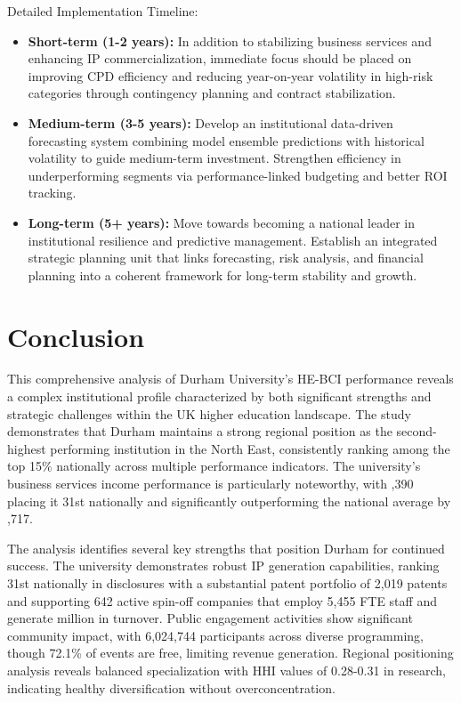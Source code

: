 \documentclass[journal,onecolumn, 10pt,draftclsnofoot]{IEEEtran}
\begin{document}
Detailed Implementation Timeline:

\begin{itemize}
    \item \textbf{Short-term (1-2 years):} In addition to stabilizing business services and enhancing IP commercialization, immediate focus should be placed on improving CPD efficiency and reducing year-on-year volatility in high-risk categories through contingency planning and contract stabilization.
    
    \item \textbf{Medium-term (3-5 years):} Develop an institutional data-driven forecasting system combining model ensemble predictions with historical volatility to guide medium-term investment. Strengthen efficiency in underperforming segments via performance-linked budgeting and better ROI tracking.
    
    \item \textbf{Long-term (5+ years):} Move towards becoming a national leader in institutional resilience and predictive management. Establish an integrated strategic planning unit that links forecasting, risk analysis, and financial planning into a coherent framework for long-term stability and growth.
\end{itemize}

\section{Conclusion}

This comprehensive analysis of Durham University's HE-BCI performance reveals a complex institutional profile characterized by both significant strengths and strategic challenges within the UK higher education landscape. The study demonstrates that Durham maintains a strong regional position as the second-highest performing institution in the North East, consistently ranking among the top 15\% nationally across multiple performance indicators. The university's business services income performance is particularly noteworthy, with ,390 placing it 31st nationally and significantly outperforming the national average by ,717.

The analysis identifies several key strengths that position Durham for continued success. The university demonstrates robust IP generation capabilities, ranking 31st nationally in disclosures with a substantial patent portfolio of 2,019 patents and supporting 642 active spin-off companies that employ 5,455 FTE staff and generate  million in turnover. Public engagement activities show significant community impact, with 6,024,744 participants across diverse programming, though 72.1\% of events are free, limiting revenue generation. Regional positioning analysis reveals balanced specialization with HHI values of 0.28-0.31 in research, indicating healthy diversification without overconcentration.
\end{document}
